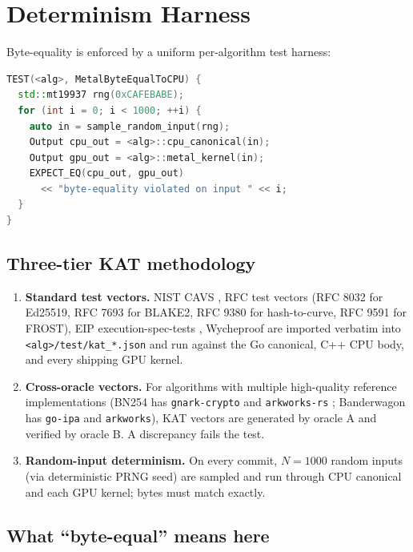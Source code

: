 \section{Determinism Harness}
\label{sec:determinism-harness}

Byte-equality is enforced by a uniform per-algorithm test harness:

\begin{lstlisting}[language=C++,caption={Per-algorithm Metal determinism test (canonical shape)}]
TEST(<alg>, MetalByteEqualToCPU) {
  std::mt19937 rng(0xCAFEBABE);
  for (int i = 0; i < 1000; ++i) {
    auto in = sample_random_input(rng);
    Output cpu_out = <alg>::cpu_canonical(in);
    Output gpu_out = <alg>::metal_kernel(in);
    EXPECT_EQ(cpu_out, gpu_out)
      << "byte-equality violated on input " << i;
  }
}
\end{lstlisting}

\subsection{Three-tier KAT methodology}

\begin{enumerate}
\item \textbf{Standard test vectors.} NIST CAVS \cite{fips180,fips202}, RFC test vectors (RFC 8032 \cite{rfc8032} for Ed25519, RFC 7693 \cite{rfc7693} for BLAKE2, RFC 9380 \cite{rfc9380} for hash-to-curve, RFC 9591 \cite{rfc9591} for FROST), EIP execution-spec-tests \cite{eip196,eip197}, Wycheproof \cite{wycheproof} are imported verbatim into \texttt{<alg>/test/kat\_*.json} and run against the Go canonical, C++ CPU body, and every shipping GPU kernel.
\item \textbf{Cross-oracle vectors.} For algorithms with multiple high-quality reference implementations (BN254 has \texttt{gnark-crypto} \cite{gnarkcrypto} and \texttt{arkworks-rs} \cite{arkworks}; Banderwagon has \texttt{go-ipa} and \texttt{arkworks}), KAT vectors are generated by oracle A and verified by oracle B. A discrepancy fails the test.
\item \textbf{Random-input determinism.} On every commit, $N=1000$ random inputs (via deterministic PRNG seed) are sampled and run through CPU canonical and each GPU kernel; bytes must match exactly.
\end{enumerate}

\subsection{What ``byte-equal'' means here}


